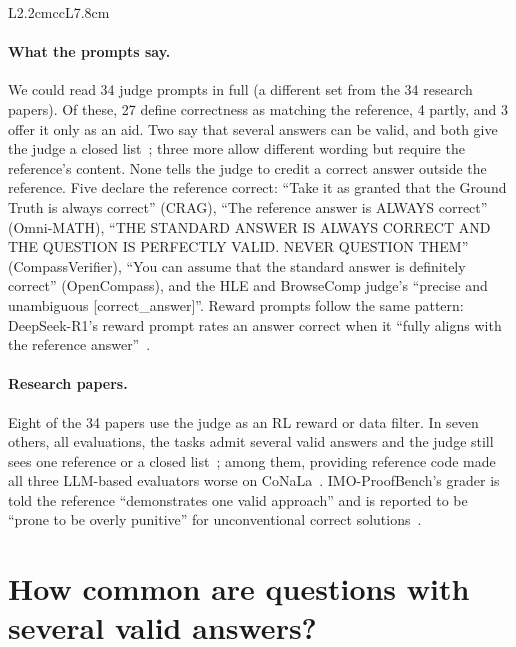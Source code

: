 \begin{table}[htbp]
\begin{tabular}{L{2.2cm}ccL{7.8cm}}
\bottomrule
\end{tabular}
\end{table}

\paragraph{What the prompts say.} We could read 34 judge prompts in full (a different set from the 34 research papers). Of these, 27 define correctness as matching the reference, 4 partly, and 3 offer it only as an aid. Two say that several answers can be valid, and both give the judge a closed list~\citep{ni2024mixeval,vu2023freshllms}; three more allow different wording but require the reference's content. None tells the judge to credit a correct answer outside the reference. Five declare the reference correct: ``Take it as granted that the Ground Truth is always correct'' (CRAG), ``The reference answer is ALWAYS correct'' (Omni-MATH), ``THE STANDARD ANSWER IS ALWAYS CORRECT AND THE QUESTION IS PERFECTLY VALID. NEVER QUESTION THEM'' (CompassVerifier), ``You can assume that the standard answer is definitely correct'' (OpenCompass), and the HLE and BrowseComp judge's ``precise and unambiguous [correct\_answer]''. Reward prompts follow the same pattern: DeepSeek-R1's reward prompt rates an answer correct when it ``fully aligns with the reference answer''~\citep{deepseek2025r1}.

\paragraph{Research papers.} Eight of the 34 papers use the judge as an RL reward or data filter. In seven others, all evaluations, the tasks admit several valid answers and the judge still sees one reference or a closed list~\citep{kamalloo2023evaluating,wang2023evouna,zheng2025deepresearcher,du2025deepresearchbench,zhuo2024icescore,tong2024codejudge,petrov2025proofbluff}; among them, providing reference code made all three LLM-based evaluators worse on CoNaLa~\citep{tong2024codejudge}. IMO-ProofBench's grader is told the reference ``demonstrates one valid approach'' and is reported to be ``prone to be overly punitive'' for unconventional correct solutions~\citep{luong2025imobench}.

\FloatBarrier
\section{How common are questions with several valid answers?}
\label{app:prevalence}

